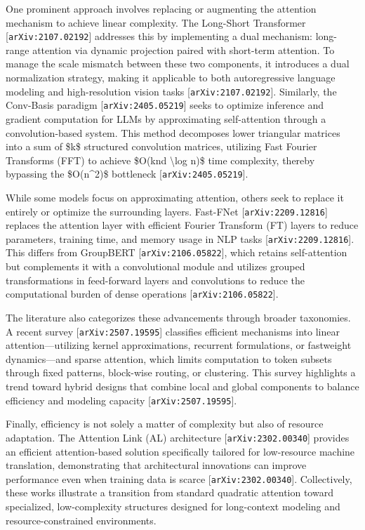 \documentclass[11pt]{article}
\begin{document}
One prominent approach involves replacing or augmenting the attention mechanism to achieve linear complexity. The Long-Short Transformer [\texttt{arXiv:2107.02192}] addresses this by implementing a dual mechanism: long-range attention via dynamic projection paired with short-term attention. To manage the scale mismatch between these two components, it introduces a dual normalization strategy, making it applicable to both autoregressive language modeling and high-resolution vision tasks [\texttt{arXiv:2107.02192}]. Similarly, the Conv-Basis paradigm [\texttt{arXiv:2405.05219}] seeks to optimize inference and gradient computation for LLMs by approximating self-attention through a convolution-based system. This method decomposes lower triangular matrices into a sum of \$k\$ structured convolution matrices, utilizing Fast Fourier Transforms (FFT) to achieve \$O(knd \textbackslash{}log n)\$ time complexity, thereby bypassing the \$O(n\textasciicircum{}2)\$ bottleneck [\texttt{arXiv:2405.05219}].

While some models focus on approximating attention, others seek to replace it entirely or optimize the surrounding layers. Fast-FNet [\texttt{arXiv:2209.12816}] replaces the attention layer with efficient Fourier Transform (FT) layers to reduce parameters, training time, and memory usage in NLP tasks [\texttt{arXiv:2209.12816}]. This differs from GroupBERT [\texttt{arXiv:2106.05822}], which retains self-attention but complements it with a convolutional module and utilizes grouped transformations in feed-forward layers and convolutions to reduce the computational burden of dense operations [\texttt{arXiv:2106.05822}].

The literature also categorizes these advancements through broader taxonomies. A recent survey [\texttt{arXiv:2507.19595}] classifies efficient mechanisms into linear attention—utilizing kernel approximations, recurrent formulations, or fastweight dynamics—and sparse attention, which limits computation to token subsets through fixed patterns, block-wise routing, or clustering. This survey highlights a trend toward hybrid designs that combine local and global components to balance efficiency and modeling capacity [\texttt{arXiv:2507.19595}].

Finally, efficiency is not solely a matter of complexity but also of resource adaptation. The Attention Link (AL) architecture [\texttt{arXiv:2302.00340}] provides an efficient attention-based solution specifically tailored for low-resource machine translation, demonstrating that architectural innovations can improve performance even when training data is scarce [\texttt{arXiv:2302.00340}]. Collectively, these works illustrate a transition from standard quadratic attention toward specialized, low-complexity structures designed for long-context modeling and resource-constrained environments.
\end{document}
